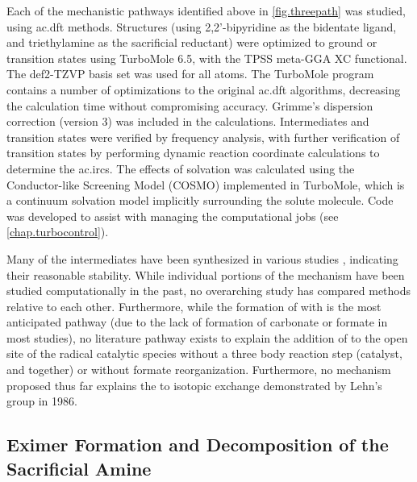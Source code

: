 Each of the mechanistic pathways identified above in \autoref{fig.threepath} was studied, using \gls{ac.dft} methods. Structures (using 2,2'-bipyridine as the bidentate ligand, and triethylamine as the sacrificial reductant) were optimized to ground or transition states using TurboMole 6.5\autocite{turbomole, ahlrichs1989}, with the TPSS meta-GGA XC functional\autocite{tao2003}. The def2-TZVP basis set was used for all atoms\autocite{schafer1994, weigend2005}. The TurboMole program contains a number of optimizations to the original \gls{ac.dft} algorithms\autocite{haase1993, treutler1995, eichkorn1997, eichkorn1995, sierka2003, deglmann2004, weigend2002, vonarnim1998, ahlrichs2004}, decreasing the calculation time without compromising accuracy. Grimme's dispersion correction (version 3) was included in the calculations\autocite{grimme2010}. Intermediates and transition states were verified by frequency analysis\autocite{deglmann2004, deglmann2002, grimme2002}, with further verification of transition states by performing dynamic reaction coordinate calculations to determine the \glspl{ac.irc}. The effects of solvation was calculated using the Conductor-like Screening Model (COSMO) implemented in TurboMole\autocite{klamt1993}, which is a continuum solvation model implicitly surrounding the solute molecule. Code was developed to assist with managing the computational jobs (see \autoref{chap.turbocontrol}).

Many of the intermediates have been synthesized in various studies \autocite{shaver1992, gibson1998, gibson1999, gibson2003}, indicating their reasonable stability. While individual portions of the mechanism have been studied computationally in the past\autocite{agarwal2011, agarwal2012a, agarwal2012b}, no overarching study has compared methods relative to each other. Furthermore, while the formation of  with  is the most anticipated pathway (due to the lack of formation of carbonate or formate in most studies), no literature pathway exists to explain the addition of  to the open site of the radical catalytic species without a three body reaction step (catalyst,  and  together) or without formate reorganization. Furthermore, no mechanism proposed thus far explains the  to  isotopic exchange demonstrated by Lehn's group in 1986\autocite{hawecker1986}. 

\subsection{Eximer Formation and Decomposition of the Sacrificial Amine}\label{ss.initiation}

